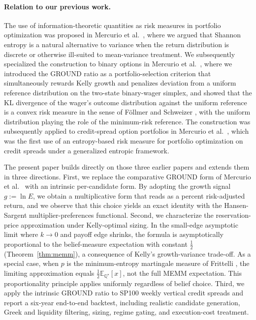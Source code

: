 \documentclass[11pt]{article}
\theoremstyle{definition}
\theoremstyle{remark}
\newcommand{\E}{\mathbb{E}}
\newcommand{\Q}{\mathbb{Q}}
\begin{document}
\paragraph{Relation to our previous work.}
The use of information-theoretic quantities as risk measures in
portfolio optimization was proposed in Mercurio et al.\ \cite{mercurio2020portfolio},
where we argued that Shannon entropy is a natural alternative to
variance when the return distribution is discrete or otherwise
ill-suited to mean-variance treatment. We subsequently specialized
the construction to binary options in Mercurio et al.\ \cite{mercurio2020binary},
where we introduced the GROUND ratio as a portfolio-selection
criterion that simultaneously rewards Kelly growth and penalizes
deviation from a uniform reference distribution on the two-state
binary-wager simplex, and showed that the KL divergence of the
wager's outcome distribution against the uniform reference is a
convex risk measure in the sense of F\"ollmer and Schweizer
\cite{follmer2002}, with the uniform distribution playing the role
of the minimum-risk reference. The construction was subsequently
applied to credit-spread option portfolios in
Mercurio et al.\ \cite{mercurio2020}, which was the first use of an
entropy-based risk measure for portfolio optimization on credit
spreads under a generalized entropic framework.

The present paper builds directly on those three earlier papers
and extends them in three directions. First, we replace the
comparative GROUND form of Mercurio et al.\ \cite{mercurio2020binary}
with an intrinsic per-candidate form. By adopting the growth signal
$g := \ln E$, we obtain a multiplicative form that reads as a
percent risk-adjusted return, and we observe that this choice yields
an exact identity with the Hansen-Sargent multiplier-preferences
functional. Second, we characterize the reservation-price approximation under Kelly-optimal sizing.
In the small-edge asymptotic limit where $k \to 0$ and payoff edge shrinks, the
formula is asymptotically proportional to the belief-measure expectation with constant $\tfrac{1}{2}$
(Theorem~\ref{thm:memm}), a consequence of Kelly's growth-variance trade-off. As a special case, when $p$ is the minimum-entropy martingale
measure of Frittelli \cite{frittelli2000}, the limiting approximation equals $\tfrac{1}{2}\E_{\Q^\star}[x]$, not the full MEMM
expectation. This proportionality principle applies uniformly regardless of belief choice. Third, we apply the intrinsic GROUND ratio to SP100 weekly
vertical credit spreads and report a six-year end-to-end backtest,
including realistic candidate generation, Greek and liquidity
filtering, sizing, regime gating, and execution-cost treatment.
\end{document}
